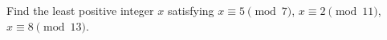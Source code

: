 Find the least positive integer $ x $ satisfying $ x\equiv5\pmod7 $, $ x\equiv2\pmod{11}$, $ x\equiv8\pmod{13}$.
